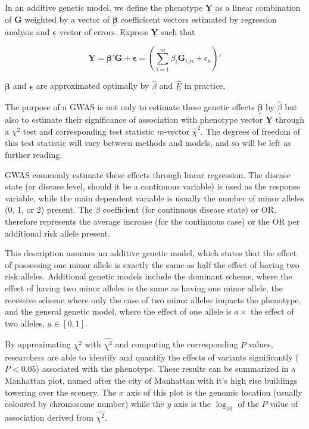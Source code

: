 In an additive genetic model, we define the phenotype $\underline{\mathbf{Y}}$ as a linear combination of $\mathbf{G}$ weighted by a vector of $\underline{\mathbf{\beta}}$ coefficicent vectors estimated by regression analysis and $\underline{\mathbf{\epsilon}}$ vector of errors. Express $\underline{\mathbf{Y}}$ such that

$$ \underline{\mathbf{Y}} = \underline{\mathbf{\beta}}' \mathbf{G} + \underline{\mathbf{\epsilon}} = \left( \sum^m_{i=1} \beta_i \mathbf{G}_{i, n} + \epsilon_n \right)' $$

$\underline{\mathbf{\beta}}$ and $\underline{\mathbf{\epsilon}}$ are approximated optimally by $\underline{\hat{\beta}}$ and $\underline{\hat{E}}$ in practice.

The purpose of a \ac{GWAS} is not only to estimate these genetic effects $\underline{\mathbf{\beta}}$ by $\underline{\hat{\beta}}$ but also to estimate their significance of association with phenotype vector $\underline{\mathbf{Y}}$ through a $\chi^2$ test and corresponding test statistic $m$-vector $\hat{\chi}^2$. The degrees of freedom of this test statistic will vary between methods and models, and so will be left as further reading. 

\ac{GWAS} commonly estimate these effects through linear regression. The disease state (or disease level, should it be a continuous variable) is used as the response variable, while the main dependent variable is usually the number of minor alleles (0, 1, or 2) present.  The $\beta$ coefficient (for continuous disease state) or \ac{OR}, therefore represents the average increase (for the continuous case) or the \ac{OR} per additional risk allele present. 


\begin{rem} This description assumes an additive genetic model, which states that the effect of possessing one minor allele is exactly the same as half the effect of having two risk alleles. Additional genetic models include the dominant scheme, where the effect of having two minor alleles is the same as having one minor allele, the recessive scheme where only the case of two minor alleles impacts the phenotype, and the general genetic model, where the effect of one allele is $a \times$ the effect of two alleles, $a \in [0,1]$. \end{rem}
 
By approximating $\underline{\chi^2}$ with $\hat{\underline{\chi^2}}$ and computing the corresponding $P$ values, researchers are able to identify and quantify the effects of variants significantly ($P < 0.05$) associated with the phenotype. These results can be summarized in a Manhattan plot, named after the city of Manhattan with it's high rise buildings towering over the scenery. The $x$ axis of this plot is the genomic location (usually coloured by chromosome number) while the $y$ axis is the $\log_{10}$ of the $P$ value of association derived from $\hat{\underline{\chi^2}}$. 


